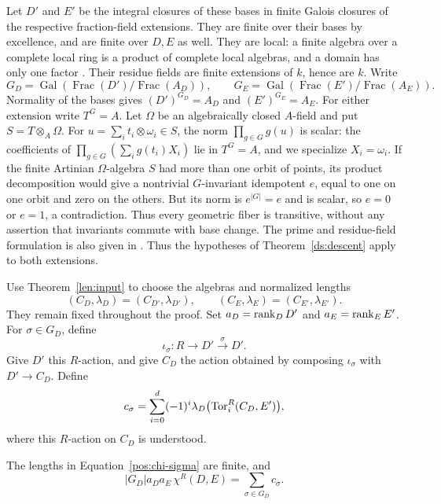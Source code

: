 Let $D'$ and $E'$ be the integral closures of these bases in finite
Galois closures of the respective fraction-field extensions.  They
are finite over their bases by excellence, and are finite over $D,E$
as well.  They are local: a finite algebra over a complete local ring
is a product of complete local algebras, and a domain has only one
factor \cite[Tag~03QH]{Stacks}. Their residue fields are finite extensions of $k$, hence are
$k$.  Write
\[
 G_D=\operatorname{Gal}(\operatorname{Frac}(D')/
                  \operatorname{Frac}(A_D)),\qquad
 G_E=\operatorname{Gal}(\operatorname{Frac}(E')/
                  \operatorname{Frac}(A_E)).
\]
Normality of the bases gives $(D')^{G_D}=A_D$ and
$(E')^{G_E}=A_E$. For either extension write $T^G=A$.
Let $\Omega$ be an algebraically closed $A$-field and put
$S=T\otimes_A\Omega$. For $u=\sum_i t_i\otimes\omega_i\in S$,
the norm $\prod_{g\in G}g(u)$ is scalar: the coefficients of
$\prod_{g\in G}(\sum_i g(t_i)X_i)$ lie in $T^G=A$, and we
specialize $X_i=\omega_i$. If the finite Artinian $\Omega$-algebra
$S$ had more than one orbit of points, its product decomposition
would give a nontrivial $G$-invariant idempotent $e$, equal to one on
one orbit and zero on the others. But its norm is $e^{|G|}=e$ and is
scalar, so $e=0$ or $e=1$, a contradiction. Thus every geometric fiber
is transitive, without any assertion that invariants commute with
base change. The prime and residue-field formulation is also given
in \cite[Tags~0BRI and 0BRJ]{Stacks}. Thus the hypotheses of
Theorem~\ref{ds:descent} apply to both extensions.

Use Theorem~\ref{len:input} to choose the algebras and normalized
lengths
\[
 (C_D,\lambda_D)=(C_{D'},\lambda_{D'}),\qquad
 (C_E,\lambda_E)=(C_{E'},\lambda_{E'}).
\]
They remain fixed throughout the proof.  Set
$a_D=\operatorname{rank}_D D'$ and $a_E=\operatorname{rank}_E E'$.  For $\sigma\in G_D$,
define
\[
 \iota_\sigma:R\longrightarrow D'
      \xrightarrow{\sigma}D'.
\]
Give $D'$ this $R$-action, and give $C_D$ the action obtained by
composing $\iota_\sigma$ with $D'\to C_D$. Define
\begin{equation}\label{pos:chi-sigma}
 c_\sigma
   =\sum_{i=0}^d(-1)^i
      \lambda_D\bigl(\operatorname{Tor}_i^R(C_D,E')\bigr),
\end{equation}
where this $R$-action on $C_D$ is understood.

\begin{lemma}\label{pos:first-average}
The lengths in Equation~\eqref{pos:chi-sigma} are finite, and
\begin{equation}\label{pos:first-average-equation}
 |G_D|a_Da_E\,\chi^R(D,E)=\sum_{\sigma\in G_D}c_\sigma.
\end{equation}
\end{lemma}

